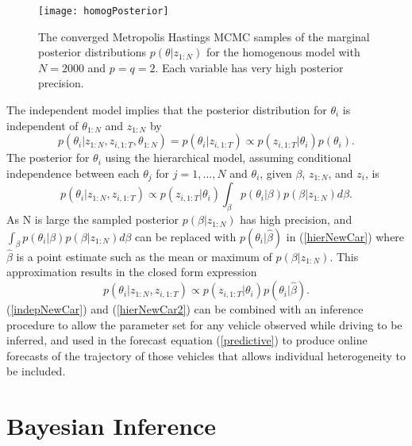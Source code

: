 \documentclass[12pt,a4paper]{article}\usepackage[]{graphicx}\usepackage[]{color}
\begin{document}
\begin{figure}
\centering
\texttt{[image: homogPosterior]}
\caption{The converged Metropolis Hastings MCMC samples of the marginal posterior distributions $p(\theta | z_{1:N})$ for the homogenous model with $N = 2000$ and $p = q = 2$. Each variable has very high posterior precision.}
\label{fig:homogPosterior}
\end{figure}

The independent model implies that the posterior distribution for $\theta_i$ is independent of $\theta_{1:N}$ and $z_{1:N}$ by
\begin{equation}
p(\theta_{i}| z_{1:N}, z_{i,1:T}, \theta_{1:N}) = p(\theta_{i} | z_{i, 1:T}) \propto p(z_{i, 1:T} | \theta_i) p(\theta_i).
\label{indepNewCar}
\end{equation}
The posterior for $\theta_i$ using the hierarchical model, assuming conditional independence between each $\theta_j$ for $j = 1, \dots, N$ and $\theta_i$, given $\beta$, $z_{1:N}$, and $z_i$, is
\begin{equation}
\label{hierNewCar}
p(\theta_{i} | z_{1:N}, z_{i, 1:T}) \propto p(z_{i, 1:T} | \theta_{i}) \int_{\beta} p(\theta_{i} | \beta) p (\beta | z_{1:N}) d\beta.
\end{equation}
As N is large the sampled posterior $p(\beta | z_{1:N})$ has high precision, and $\int_{\beta} p(\theta_{i} | \beta) p (\beta | z_{1:N}) d\beta$ can be replaced with $p(\theta_{i} | \hat{\beta})$ in (\ref{hierNewCar}) where $\hat{\beta}$ is a point estimate such as the mean or maximum of $p(\beta | z_{1:N})$. This approximation results in the closed form expression
\begin{equation}
\label{hierNewCar2}
p(\theta_{i} | z_{1:N}, z_{i, 1:T}) \propto p(z_{i, 1:T} | \theta_{i}) p(\theta_{i} | \hat{\beta}).
\end{equation}
(\ref{indepNewCar}) and (\ref{hierNewCar2}) can be combined with an inference procedure to allow the parameter set for any vehicle observed while driving to be inferred, and used in the forecast equation (\ref{predictive}) to produce online forecasts of the trajectory of those vehicles that allows individual heterogeneity to be included.

\section{Bayesian Inference}
\label{sec:Inference}
\end{document}
